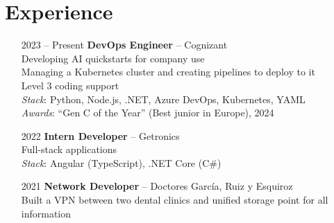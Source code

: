 \section*{Experience}
\begin{itemize}
    \item[2023 -- Present] \textbf{DevOps Engineer} -- Cognizant\\
    Developing AI quickstarts for company use\\
    Managing a Kubernetes cluster and creating pipelines to deploy to it\\
    Level 3 coding support\\
    \emph{Stack}: Python, Node.js, .NET, Azure DevOps, Kubernetes, YAML\\
    \emph{Awards}: ``Gen C of the Year'' (Best junior in Europe), 2024
    \item[2022] \textbf{Intern Developer} -- Getronics\\
    Full-stack applications\\
    \emph{Stack}: Angular (TypeScript), .NET Core (C\#)
    \item[2021] \textbf{Network Developer} -- Doctores Garc\'ia, Ruiz y Esquiroz\\
    Built a VPN between two dental clinics and unified storage point for all information
\end{itemize}

